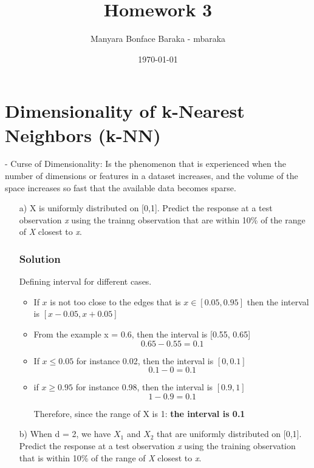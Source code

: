 \documentclass{article}
\begin{document}
\title{Homework 3}
\author{Manyara Bonface Baraka - mbaraka}
\date{\today}
\maketitle

\section{Dimensionality of k-Nearest Neighbors (k-NN)}

 - Curse of Dimensionality: Is the phenomenon that is experienced when the number of
  dimensions or features in a dataset increases, and the volume of the space increases so fast that the available data becomes sparse.


\begin{enumerate}
  \item[a)] X is uniformly distributed on [0,1]. Predict the response at a test observation
  \textit{x} using the trainng observation that are within 10\% of the range of \textit{X} closest to \textit{x}.

  \subsubsection*{Solution}
  Defining interval for different cases.
  \begin{itemize}
        \item If $x$ is not too close to the edges that is $x \in [0.05, 0.95]$ then the interval is $[x-0.05, x+0.05]$
        \item From the example x = 0.6, then the interval is [0.55, 0.65]
        \[0.65 - 0.55 = 0.1\]

        \item If $x \le 0.05$ for instance 0.02, then the interval is $[0, 0.1]$
        \[0.1 - 0 = 0.1\]

        \item if $x \ge 0.95$ for instance 0.98, then the interval is $[0.9, 1]$
        \[1 - 0.9 = 0.1\]

        Therefore, since the range of X is 1: \textbf{the interval is 0.1}
  \end{itemize}

  \item[b)] When d = 2, we have $X_1$ and $X_2$ that are uniformly distributed on [0,1].
   Predict the response at a test observation \textit{x} using the training observation that
    is within 10\% of the range of \textit{X} closest to \textit{x}.


\end{enumerate}
\end{document}
